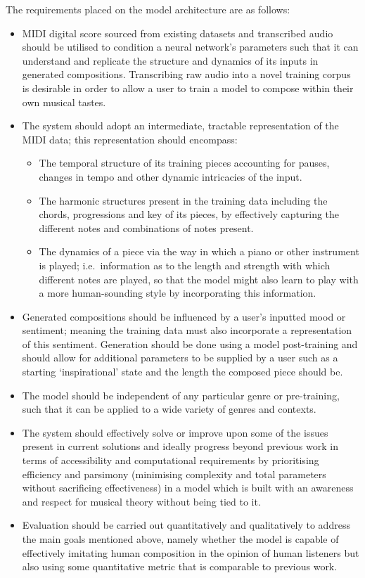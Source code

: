 \documentclass[12pt,]{article}
\providecommand{\tightlist}{%
  \setlength{\itemsep}{0pt}\setlength{\parskip}{0pt}}
\begin{document}
The requirements placed on the model architecture are as follows:

\begin{itemize}
\tightlist
\item
  MIDI digital score sourced from existing datasets and transcribed
  audio should be utilised to condition a neural network's parameters
  such that it can understand and replicate the structure and dynamics
  of its inputs in generated compositions. Transcribing raw audio into a
  novel training corpus is desirable in order to allow a user to train a
  model to compose within their own musical tastes.
\item
  The system should adopt an intermediate, tractable representation of
  the MIDI data; this representation should encompass:

  \begin{itemize}
  \tightlist
  \item
    The temporal structure of its training pieces accounting for pauses,
    changes in tempo and other dynamic intricacies of the input.
  \item
    The harmonic structures present in the training data including the
    chords, progressions and key of its pieces, by effectively capturing
    the different notes and combinations of notes present.
  \item
    The dynamics of a piece via the way in which a piano or other
    instrument is played; i.e.~information as to the length and strength
    with which different notes are played, so that the model might also
    learn to play with a more human-sounding style by incorporating this
    information.
  \end{itemize}
\item
  Generated compositions should be influenced by a user's inputted mood
  or sentiment; meaning the training data must also incorporate a
  representation of this sentiment. Generation should be done using a
  model post-training and should allow for additional parameters to be
  supplied by a user such as a starting `inspirational' state and the
  length the composed piece should be.
\item
  The model should be independent of any particular genre or
  pre-training, such that it can be applied to a wide variety of genres
  and contexts.
\item
  The system should effectively solve or improve upon some of the issues
  present in current solutions and ideally progress beyond previous work
  in terms of accessibility and computational requirements by
  prioritising efficiency and parsimony (minimising complexity and total
  parameters without sacrificing effectiveness) in a model which is
  built with an awareness and respect for musical theory without being
  tied to it.
\item
  Evaluation should be carried out quantitatively and qualitatively to
  address the main goals mentioned above, namely whether the model is
  capable of effectively imitating human composition in the opinion of
  human listeners but also using some quantitative metric that is
  comparable to previous work.
\end{itemize}
\end{document}
